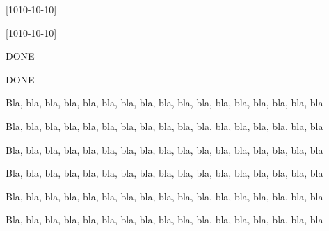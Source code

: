 \documentclass[theme = color]{../main/main}
\begin{document}
[1010-10-10]

\bigskip

[1010-10-10]

\bigskip
\bigskip
\bigskip

DONE

\bigskip

DONE

\bigskip

Bla, bla, bla, bla, bla, bla, bla, bla, bla, bla, bla, bla, bla, bla, bla, bla, bla

\begin{tdocfix}
	\item Bla, bla, bla, bla, bla, bla, bla, bla, bla, bla, bla, bla, bla, bla, bla, bla, bla
\end{tdocfix}

Bla, bla, bla, bla, bla, bla, bla, bla, bla, bla, bla, bla, bla, bla, bla, bla, bla

\begin{tdocnew}
	\item Bla, bla, bla, bla, bla, bla, bla, bla, bla, bla, bla, bla, bla, bla, bla, bla, bla
\end{tdocnew}

Bla, bla, bla, bla, bla, bla, bla, bla, bla, bla, bla, bla, bla, bla, bla, bla, bla

\begin{tdocbreak}
	\item Bla, bla, bla, bla, bla, bla, bla, bla, bla, bla, bla, bla, bla, bla, bla, bla, bla
\end{tdocbreak}
\end{document}
